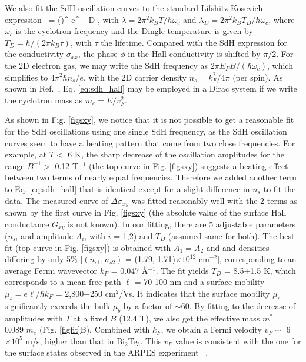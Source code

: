 We also fit the SdH oscillation curves to the standard Lifshitz-Kosevich expression~\cite{Jalan2010} 
\be
{} = \left(\right)^{}
\frac{\lambda}{\sinh\lambda} e^{-\lambda_D}\cos
{},
\label{eq:sdh_hall}
\ee
with $\lambda = 2\pi^2k_BT/\hbar\omega_c$ and $\lambda_D = 2\pi^2k_BT_D/\hbar\omega_c$,
where $\omega_c$ is the cyclotron frequency and 
the Dingle temperature is given by $T_D = \hbar/(2\pi k_B\tau)$,
with $\tau$ the lifetime.  Compared with
the SdH expression for the conductivity $\sigma_{xx}$, the phase $\phi$ in the 
Hall conductivity is shifted by $\pi/2$.
For the 2D electron gas, we may write the SdH frequency as
$2\pi E_FB/(\hbar\omega_c)$, which simplifies to $4\pi^2\hbar n_s/e$, with the 2D
carrier density $n_s = k_F^2/4\pi$ (per spin).  
As shown in Ref.~\cite{Gusynin2005}, Eq. \ref{eq:sdh_hall} may be employed in a Dirac system
if we write the cyclotron mass as $m_c = E/v_F^2$.  

As shown in Fig. \ref{figsxy}, we notice that it is not possible to get a reasonable fit for the SdH oscillations using one single SdH
frequency, as the SdH oscillation curves seem to have a beating pattern that come from two close frequencies.  For example, at $T<$ 6 K, the sharp decrease of the oscillation amplitudes for the range $B^{-1}>$ 0.12 T$^{-1}$ (the top curve in Fig. \ref{figsxy}) suggests a beating effect between two terms of nearly equal frequencies. Therefore we added another term to Eq. \ref{eq:sdh_hall} that is identical except for a slight difference in $n_s$ to fit the data. The measured curve of $\Delta\sigma_{xy}$ was fitted reasonably well with the 2 terms as shown by the first curve in Fig. \ref{figsxy} (the absolute value of the surface Hall conductance $G_{xy}$ is not known). In our fitting, there are 5 adjustable parameters ($n_{si}$ and amplitude $A_i$, with $i$ = 1,2) and $T_D$ (assumed same for both). The best fit (top curve in Fig. \ref{figsxy}) is obtained with $A_1 = A_2$ and and densities differing by only 5$\%$ [$(n_{s1}, n_{s2})$ = (1.79, 1.71)$\times 10^{12}$ cm$^{-2}$], corresponding to an average Fermi wavevector $k_F$ = 0.047 \AA$^{-1}$. The fit yields $T_D$ = 8.5$\pm$1.5 K, which corresponds to a mean-free-path $\ell$ = 70-100 nm and a surface mobility $\mu_s = e\ell/\hbar k_F$ = 2,800$\pm$250 cm$^2$/Vs. It indicates that the surface mobility $\mu_s$ significantly exceeds the bulk $\mu_b$ by a factor of $\sim$60. By fitting to the decrease of amplitudes with $T$ at a fixed $B$ (12.4 T), we also get the effective mass $m^*$ = 0.089 $m_e$ (Fig. \ref{figfit}B).  Combined with $k_F$, we obtain a Fermi velocity $v_F\sim$ 6 $\times 10^5$ m/s, higher than that in Bi$_2$Te$_3$. This $v_F$ value is consistent with the one for the surface states observed in the ARPES experiment ~\cite{BTS_ARPES}.


